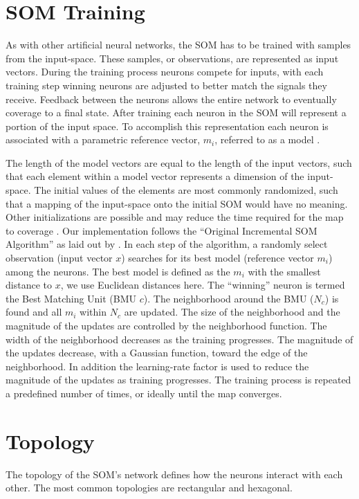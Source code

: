 \section{SOM Training}
As with other artificial neural networks, the SOM has to be trained with
samples from the input-space.  These samples, or observations, are represented
as input vectors.  During the training process neurons compete for inputs,
with each training step winning neurons are adjusted to better match the
signals they receive.  Feedback between the neurons allows the entire network to
eventually coverage to a final state. After training each neuron in the SOM
will represent a portion of the input space.  To accomplish this
representation each neuron is associated with a parametric reference vector,
\(m_i\), referred to as a model \cite{Kohonen2000}.

The length of the model vectors are equal to the length of the input vectors, such
that each element within a model vector represents a dimension of the input-space.
The initial values of the elements are most commonly randomized, such that a
mapping of the input-space onto the initial SOM would have no meaning. Other
initializations are possible and may reduce the time required for the map to
coverage \cite{Kohonen2000}.  Our implementation follows the ``Original
Incremental SOM Algorithm'' as laid out by \cite[pp 109-115]{Kohonen2000}.
In each step of the algorithm, a randomly select observation (input vector
$x$) searches for its best model (reference vector $m_i$) among the neurons.
The best model is defined as the $m_i$ with the smallest distance to $x$, we
use Euclidean distances here.  The ``winning'' neuron is termed the Best
Matching Unit (BMU $c$).  The neighborhood around the BMU ($N_c$) is found and
all $m_i$ within $N_c$ are updated.  The size of the neighborhood and the
magnitude of the updates are controlled by the neighborhood function. The
width of the neighborhood decreases as the training progresses. The magnitude
of the updates decrease, with a Gaussian function, toward the edge of the
neighborhood. In addition the learning-rate factor is used to reduce the
magnitude of the updates as training progresses.  The training process is repeated a
predefined number of times, or ideally until the map converges.

\section{Topology}
The topology of the SOM's network defines how the neurons interact with each
other.  The most common topologies are rectangular and hexagonal.


